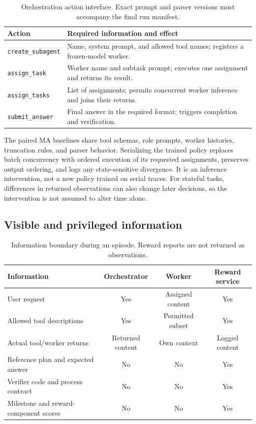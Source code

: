 \begin{table}[ht]
\centering\small
\caption{Orchestration action interface. Exact prompt and parser versions must accompany the final run manifest.}
\label{tab:actions}
\begin{tabularx}{\linewidth}{lY}
\toprule
Action & Required information and effect \\
\midrule
\texttt{create\_subagent} & Name, system prompt, and allowed tool names; registers a frozen-model worker. \\
\texttt{assign\_task} & Worker name and subtask prompt; executes one assignment and returns its result. \\
\texttt{assign\_tasks} & List of assignments; permits concurrent worker inference and joins their returns. \\
\texttt{submit\_answer} & Final answer in the required format; triggers completion and verification. \\
\bottomrule
\end{tabularx}
\end{table}

The paired MA baselines share tool schemas, role prompts, worker histories, truncation rules, and parser behavior. Serializing the trained policy replaces batch concurrency with ordered execution of its requested assignments, preserves output ordering, and logs any state-sensitive divergence. It is an inference intervention, not a new policy trained on serial traces. For stateful tasks, differences in returned observations can also change later decisions, so the intervention is not assumed to alter time alone.

\subsection{Visible and privileged information}

\begin{table}[ht]
\centering\small
\caption{Information boundary during an episode. Reward reports are not returned as observations.}
\label{tab:visibility}
\begin{tabularx}{\linewidth}{Yccc}
\toprule
Information & Orchestrator & Worker & Reward service \\
\midrule
User request & Yes & Assigned content & Yes \\
Allowed tool descriptions & Yes & Permitted subset & Yes \\
Actual tool/worker returns & Returned content & Own context & Logged content \\
Reference plan and expected answer & No & No & Yes \\
Verifier code and process contract & No & No & Yes \\
Milestone and reward-component scores & No & No & Yes \\
\bottomrule
\end{tabularx}
\end{table}

